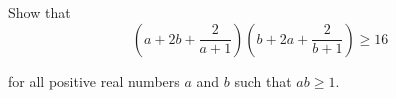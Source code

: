 Show that\[\left(a+2b+\dfrac{2}{a+1}\right)\left(b+2a+\dfrac{2}{b+1}\right)\geq 16\]

for all positive real numbers $a$ and $b$ such  that $ab\geq 1$.